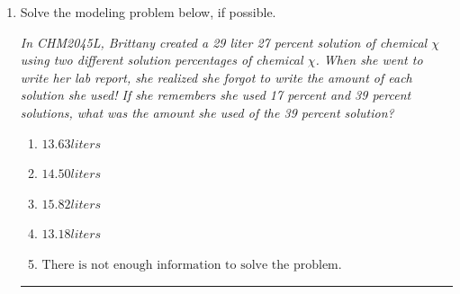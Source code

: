 \documentclass[14pt]{extbook}
\newcommand{\litem}[1]{\item#1\hspace*{-1cm}\rule{\textwidth}{0.4pt}}
\begin{document}
\begin{enumerate}
{\begin{enumerate}[label=\Alph*.]
\end{enumerate} }
\litem{
Solve the modeling problem below, if possible.
\begin{center}
    \textit{ In CHM2045L, Brittany created a 29 liter 27 percent solution of chemical $\chi$ using two different solution percentages of chemical $\chi$. When she went to write her lab report, she realized she forgot to write the amount of each solution she used! If she remembers she used 17 percent and 39 percent solutions, what was the amount she used of the 39 percent solution? }
\end{center}
\begin{enumerate}[label=\Alph*.]
\item \( 13.63 liters \)
\item \( 14.50 liters \)
\item \( 15.82 liters \)
\item \( 13.18 liters \)
\item \( \text{There is not enough information to solve the problem.} \)

\end{enumerate} }
\end{enumerate}
\end{document}

